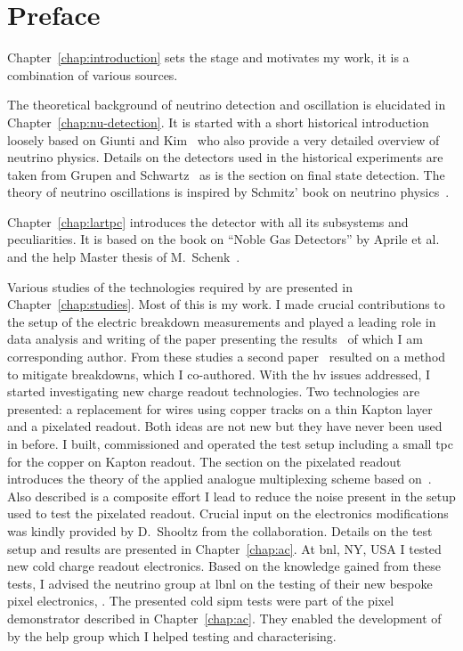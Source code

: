 \renewcommand{\Chapter}{{Preface}}
\chapter*{\Chapter}
\chaptermark{\Chapter}

Chapter~\ref{chap:introduction} sets the stage and motivates my work, it is a combination of various sources.

The theoretical background of neutrino detection and oscillation is elucidated in Chapter~\ref{chap:nu-detection}.
It is started with a short historical introduction loosely based on Giunti and Kim~\cite{giunti} who also provide a very detailed overview of neutrino physics.
Details on the detectors used in the historical experiments are taken from Grupen and Schwartz~\cite{grupen} as is the section on final state detection.
The theory of neutrino oscillations is inspired by Schmitz' book on neutrino physics~\cite{schmitz}.

Chapter~\ref{chap:lartpc} introduces the \lartpc{} detector with all its subsystems and peculiarities.
It is based on the book on ``Noble Gas Detectors'' by Aprile et al.~\cite{NobleGasDetectors} and the \gls{help} Master thesis of M.\ Schenk~\cite{michu}.

Various studies of the technologies required by \AC{} are presented in Chapter~\ref{chap:studies}.
Most of this is my work.
I made crucial contributions to the setup of the electric breakdown measurements and played a leading role in data analysis and writing of the paper presenting the results~\cite{breakdown_16} of which I am corresponding author.
From these studies a second paper~\cite{latex} resulted on a method to mitigate breakdowns, which I co-authored.
With the \gls{hv} issues addressed, I started investigating new charge readout technologies.
Two technologies are presented: a replacement for wires using copper tracks on a thin Kapton layer and a pixelated readout.
Both ideas are not new but they have never been used in \lar{} before.
I built, commissioned and operated the test setup including a small \gls{tpc} for the copper on Kapton readout.
The section on the pixelated readout introduces the theory of the applied analogue multiplexing scheme based on~\cite{maplesyrup}.
Also described is a composite effort I lead to reduce the noise present in the setup used to test the pixelated readout.
Crucial input on the electronics modifications was kindly provided by D.\ Shooltz from the \lariat{} collaboration.
Details on the test setup and results are presented in Chapter~\ref{chap:ac}.
At \gls{bnl}, NY, USA I tested new cold charge readout electronics.
Based on the knowledge gained from these tests, I advised the neutrino group at \gls{lbnl} on the testing of their new bespoke pixel electronics, \larpix{}.
The presented cold \gls{sipm} tests were part of the pixel demonstrator described in Chapter~\ref{chap:ac}.
They enabled the development of \AL{}~\cite{arclight} by the \gls{help} \lar{} group which I helped testing and characterising.

